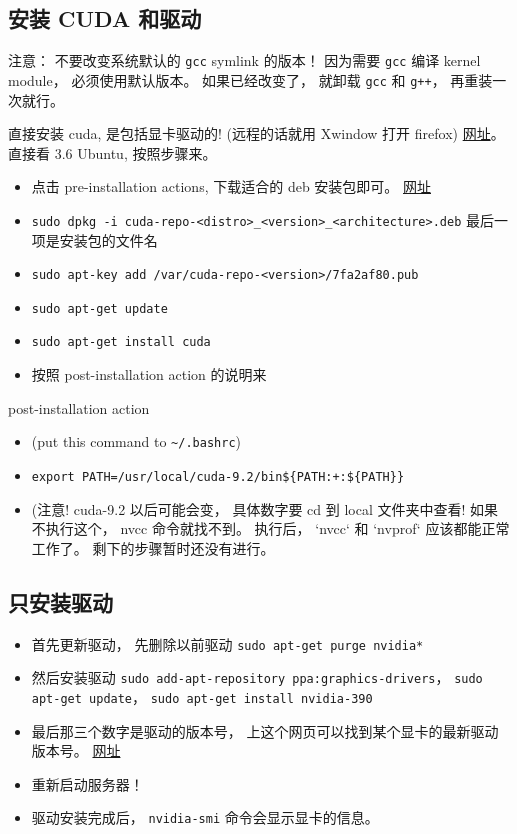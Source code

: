 
\subsection{安装 CUDA 和驱动}
注意： 不要改变系统默认的 \verb|gcc| symlink 的版本！ 因为需要 \verb|gcc| 编译 kernel module， 必须使用默认版本。 如果已经改变了， 就卸载 \verb|gcc| 和 \verb|g++|， 再重装一次就行。

直接安装 cuda, 是包括显卡驱动的! (远程的话就用 Xwindow 打开 firefox)
\href{https://docs.nvidia.com/cuda/cuda-installation-guide-linux/index.html#ubuntu-installation}{网址}。 直接看 3.6 Ubuntu, 按照步骤来。
\begin{itemize}
\item 点击 pre-installation actions, 下载适合的 deb 安装包即可。 \href{https://developer.nvidia.com/cuda-downloads}{网址}
\item \verb`sudo dpkg -i cuda-repo-<distro>_<version>_<architecture>.deb`   最后一项是安装包的文件名
\item \verb`sudo apt-key add /var/cuda-repo-<version>/7fa2af80.pub`
\item \verb`sudo apt-get update`
\item \verb`sudo apt-get install cuda`
\item 按照 post-installation action 的说明来
\end{itemize}

post-installation action
\begin{itemize}
\item (put this command to \verb|~/.bashrc|)
\item \verb`export PATH=/usr/local/cuda-9.2/bin${PATH:+:${PATH}}`
\item (注意! cuda-9.2 以后可能会变， 具体数字要 cd 到 local 文件夹中查看!
如果不执行这个， nvcc 命令就找不到。 执行后， `nvcc` 和 `nvprof` 应该都能正常工作了。
剩下的步骤暂时还没有进行。
\end{itemize}

\subsection{只安装驱动}
\begin{itemize}
\item 首先更新驱动， 先删除以前驱动 \verb|sudo apt-get purge nvidia*|
\item 然后安装驱动 \verb|sudo add-apt-repository ppa:graphics-drivers|， \verb|sudo apt-get update|， \verb|sudo apt-get install nvidia-390|
\item 最后那三个数字是驱动的版本号， 上这个网页可以找到某个显卡的最新驱动版本号。 \href{http://www.nvidia.com/Download/index.aspx?lang=en-us}{网址}
\item 重新启动服务器！
\item 驱动安装完成后， \verb|nvidia-smi| 命令会显示显卡的信息。
\end{itemize}
